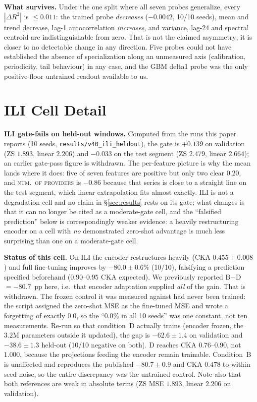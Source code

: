 \documentclass{article}
\begin{document}
\textbf{What survives.} Under the one split where all seven probes generalize, every $|\Delta R^2|$
is $\le 0.011$: the trained probe \emph{decreases} ($-0.0042$, 10/10 seeds), mean and trend decrease,
lag-1 autocorrelation \emph{increases}, and variance, lag-24 and spectral centroid are
indistinguishable from zero. That is not the claimed asymmetry; it is closer to no detectable change
in any direction. Five probes could not have established the absence of specialization along an
unmeasured axis (calibration, periodicity, tail behaviour) in any case, and the GBM delta1 probe was
the only positive-floor untrained readout available to us.

\section{ILI Cell Detail}
\label{app:ili}

\textbf{ILI gate-fails on held-out windows.}
Computed from the runs this paper reports (10 seeds, \texttt{results/v40\_ili\_heldout}), the gate is
$+0.139$ on validation (ZS $1.893$, linear $2.206$) and $\mathbf{-0.033}$ on the test segment
(ZS $2.479$, linear $2.664$); an earlier gate-pass figure is withdrawn. The per-feature picture is why the mean lands where it does: five of seven features are
positive but only two clear $0.20$, and \textsc{num.\ of providers} is $-0.86$ because that series is
close to a straight line on the test segment, which linear extrapolation fits almost exactly. ILI is
not a degradation cell and no claim in \S\ref{sec:results} rests on its gate; what changes is that it
can no longer be cited as a moderate-gate cell, and the ``falsified prediction'' below is
correspondingly weaker evidence: a heavily restructuring encoder on a cell with \emph{no}
demonstrated zero-shot advantage is much less surprising than one on a moderate-gate cell.

\textbf{Status of this cell.}
On ILI the encoder restructures heavily (CKA $0.455{\pm}0.008$) and full fine-tuning improves by $-80.0{\pm}0.6\%$ (10/10), falsifying a prediction specified beforehand ($0.90$--$0.95$ CKA expected). We previously reported B$-$D${=}{-}80.7$~pp here, i.e.\ that encoder adaptation supplied \emph{all} of the gain. That is withdrawn. The frozen control it was measured against had never been trained: the script assigned the zero-shot MSE as the fine-tuned MSE and wrote a forgetting of exactly $0.0$, so the ``$0.0\%$ in all 10 seeds'' was one constant, not ten measurements. Re-run so that condition~D actually trains (encoder frozen, the $3.2$M parameters outside it updated), the gap is $-62.6{\pm}1.4$ on validation and $-38.6{\pm}1.3$ held-out (10/10 negative on both). D reaches CKA $0.76$--$0.90$, not $1.000$, because the projections feeding the encoder remain trainable. Condition~B is unaffected and reproduces the published $-80.7{\pm}0.9$ and CKA $0.478$ to within seed noise, so the entire discrepancy was the untrained control. Note also that both references are weak in absolute terms (ZS MSE $1.893$, linear $2.206$ on validation).
\end{document}
